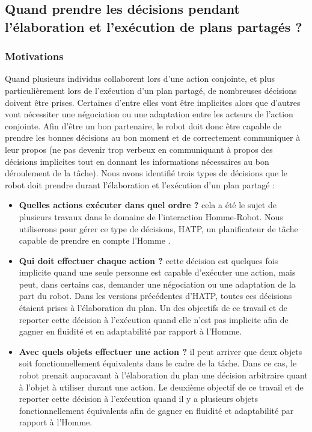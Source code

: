 \documentclass[english,a4paper,11pt,twoside]{StyleThese}
\begin{document}
\newpage
\subsection{Quand prendre les décisions pendant l'élaboration et l'exécution de plans partagés ?}


\subsubsection{Motivations}

Quand plusieurs individus collaborent lors d'une action conjointe, et plus particulièrement lors de l'exécution d'un plan partagé, de nombreuses décisions doivent être prises. Certaines d'entre elles vont être implicites alors que d'autres vont nécessiter une négociation ou une adaptation entre les acteurs de l'action conjointe. Afin d'être un bon partenaire, le robot doit donc être capable de prendre les bonnes décisions au bon moment et de correctement communiquer à leur propos (ne pas devenir trop verbeux en communiquant à propos des décisions implicites tout en donnant les informations nécessaires au bon déroulement de la tâche). Nous avons identifié trois types de décisions que le robot doit prendre durant l'élaboration et l'exécution d'un plan partagé :
\begin{itemize}
\item \textbf{Quelles actions exécuter dans quel ordre ?} cela a été le sujet de plusieurs travaux dans le domaine de l'interaction Homme-Robot. Nous utiliserons pour gérer ce type de décisions, HATP, un planificateur de tâche  capable de prendre en compte l'Homme \cite{Lallement2014hatp}.
\item \textbf{Qui doit effectuer chaque action ?} cette décision est quelques fois implicite quand une seule personne est capable d'exécuter une action, mais peut, dans certains cas, demander une négociation ou une adaptation de la part du robot. Dans les versions précédentes d'HATP, toutes ces décisions étaient prises à l'élaboration du plan. Un des objectifs de ce travail et de reporter cette décision à l'exécution quand elle n'est pas implicite afin de gagner en fluidité et en adaptabilité par rapport à l'Homme.
\item \textbf{Avec quels objets effectuer une action ?} il peut arriver que deux objets soit fonctionnellement équivalents dans le cadre de la tâche. Dans ce cas, le robot prenait auparavant à l'élaboration du plan une décision arbitraire quant à l'objet à utiliser durant une action. Le deuxième objectif de ce travail et de reporter cette décision à l'exécution quand il y a plusieurs objets fonctionnellement équivalents afin de gagner en fluidité et adaptabilité par rapport à l'Homme.
\end{itemize}
\end{document}
